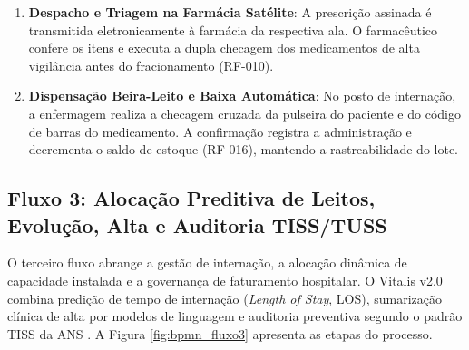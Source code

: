 \begin{enumerate}[leftmargin=*]
    \item \textbf{Despacho e Triagem na Farmácia Satélite}: A prescrição assinada é transmitida eletronicamente à farmácia da respectiva ala. O farmacêutico confere os itens e executa a dupla checagem dos medicamentos de alta vigilância antes do fracionamento (RF-010).
    \item \textbf{Dispensação Beira-Leito e Baixa Automática}: No posto de internação, a enfermagem realiza a checagem cruzada da pulseira do paciente e do código de barras do medicamento. A confirmação registra a administração e decrementa o saldo de estoque (RF-016), mantendo a rastreabilidade do lote.
\end{enumerate}

\subsection{Fluxo 3: Alocação Preditiva de Leitos, Evolução, Alta e Auditoria TISS/TUSS}
\label{subsec:bpmn_fluxo3}

O terceiro fluxo abrange a gestão de internação, a alocação dinâmica de capacidade instalada e a governança de faturamento hospitalar. O Vitalis v2.0 combina predição de tempo de internação (\textit{Length of Stay}, LOS), sumarização clínica de alta por modelos de linguagem e auditoria preventiva segundo o padrão TISS da ANS \cite{ans_tiss:2023}. A Figura \ref{fig:bpmn_fluxo3} apresenta as etapas do processo.

